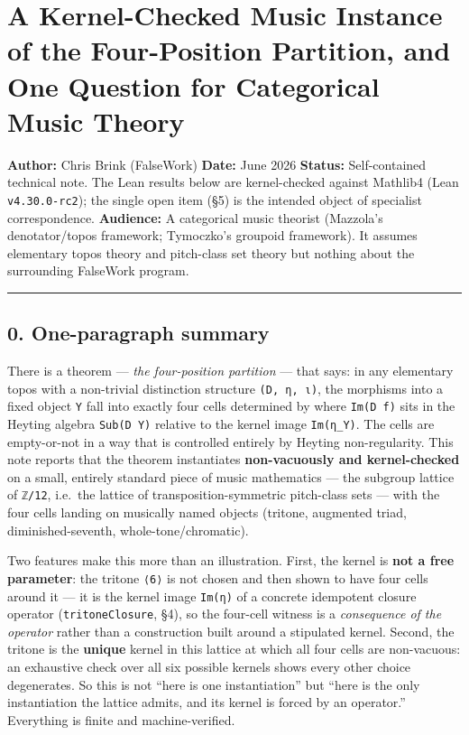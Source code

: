 \documentclass[
  11pt,
]{article}
\author{}
\date{}
\begin{document}
\section{A Kernel-Checked Music Instance of the Four-Position Partition,
and One Question for Categorical Music
Theory}\label{a-kernel-checked-music-instance-of-the-four-position-partition-and-one-question-for-categorical-music-theory}

\textbf{Author:} Chris Brink (FalseWork) \textbf{Date:} June 2026
\textbf{Status:} Self-contained technical note. The Lean results below
are kernel-checked against Mathlib4 (Lean \texttt{v4.30.0-rc2}); the
single open item (§5) is the intended object of specialist
correspondence. \textbf{Audience:} A categorical music theorist
(Mazzola's denotator/topos framework; Tymoczko's groupoid framework). It
assumes elementary topos theory and pitch-class set theory but nothing
about the surrounding FalseWork program.

\begin{center}\rule{0.5\linewidth}{0.5pt}\end{center}

\subsection{0. One-paragraph summary}\label{one-paragraph-summary}

There is a theorem --- \emph{the four-position partition} --- that says:
in any elementary topos with a non-trivial distinction structure
\texttt{(D,\ η,\ ι)}, the morphisms into a fixed object \texttt{Y} fall
into exactly four cells determined by where \texttt{Im(D\ f)} sits in
the Heyting algebra \texttt{Sub(D\ Y)} relative to the kernel image
\texttt{Im(η\_Y)}. The cells are empty-or-not in a way that is
controlled entirely by Heyting non-regularity. This note reports that
the theorem instantiates \textbf{non-vacuously and kernel-checked} on a
small, entirely standard piece of music mathematics --- the subgroup
lattice of \texttt{ℤ/12}, i.e.~the lattice of transposition-symmetric
pitch-class sets --- with the four cells landing on musically named
objects (tritone, augmented triad, diminished-seventh,
whole-tone/chromatic).

Two features make this more than an illustration. First, the kernel is
\textbf{not a free parameter}: the tritone \texttt{⟨6⟩} is not chosen
and then shown to have four cells around it --- it is the kernel image
\texttt{Im(η)} of a concrete idempotent closure operator
(\texttt{tritoneClosure}, §4), so the four-cell witness is a
\emph{consequence of the operator} rather than a construction built
around a stipulated kernel. Second, the tritone is the \textbf{unique}
kernel in this lattice at which all four cells are non-vacuous: an
exhaustive check over all six possible kernels shows every other choice
degenerates. So this is not ``here is one instantiation'' but ``here is
the only instantiation the lattice admits, and its kernel is forced by
an operator.'' Everything is finite and machine-verified.
\end{document}
